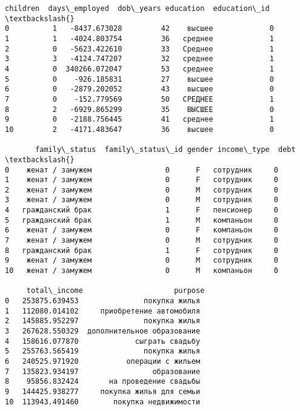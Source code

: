\documentclass[11pt]{article}
\newcommand{\prompt}[4]{
        \llap{{\color{#2}[#3]: #4}}\vspace{-1.25em}
    }
\begin{document}
            \begin{tcolorbox}[breakable, boxrule=.5pt, size=fbox, pad at break*=1mm, opacityfill=0]
\prompt{Out}{outcolor}{100}{\hspace{3.5pt}}
\begin{Verbatim}[commandchars=\\\{\}]
    children  days\_employed  dob\_years education  education\_id  \textbackslash{}
0          1   -8437.673028         42    высшее             0
1          1   -4024.803754         36   среднее             1
2          0   -5623.422610         33   Среднее             1
3          3   -4124.747207         32   среднее             1
4          0  340266.072047         53   среднее             1
5          0    -926.185831         27    высшее             0
6          0   -2879.202052         43    высшее             0
7          0    -152.779569         50   СРЕДНЕЕ             1
8          2   -6929.865299         35    ВЫСШЕЕ             0
9          0   -2188.756445         41   среднее             1
10         2   -4171.483647         36    высшее             0

       family\_status  family\_status\_id gender income\_type  debt  \textbackslash{}
0    женат / замужем                 0      F   сотрудник     0
1    женат / замужем                 0      F   сотрудник     0
2    женат / замужем                 0      M   сотрудник     0
3    женат / замужем                 0      M   сотрудник     0
4   гражданский брак                 1      F   пенсионер     0
5   гражданский брак                 1      M   компаньон     0
6    женат / замужем                 0      F   компаньон     0
7    женат / замужем                 0      M   сотрудник     0
8   гражданский брак                 1      F   сотрудник     0
9    женат / замужем                 0      M   сотрудник     0
10   женат / замужем                 0      M   компаньон     0

     total\_income                     purpose
0   253875.639453               покупка жилья
1   112080.014102     приобретение автомобиля
2   145885.952297               покупка жилья
3   267628.550329  дополнительное образование
4   158616.077870             сыграть свадьбу
5   255763.565419               покупка жилья
6   240525.971920           операции с жильем
7   135823.934197                 образование
8    95856.832424       на проведение свадьбы
9   144425.938277     покупка жилья для семьи
10  113943.491460        покупка недвижимости
\end{Verbatim}
\end{tcolorbox}
        
\end{document}
